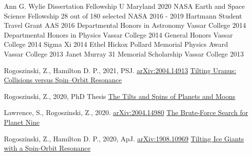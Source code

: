 \documentclass[]{awesome-cv}
\begin{document}
\vspace{-4mm}


\begin{cvhonors}
	\cvhonor
	{Ann G. Wylie Dissertation Fellowship}
	{}
	{U Maryland}
	{2020}
	\cvhonor
	{NASA Earth and Space Science Fellowship}
	{28 out of 180 selected}
	{NASA}
	{2016 - 2019}
	\cvhonor
	{Hartmann Student Travel Grant}
	{}
	{AAS}
	{2016}
	\cvhonor
	{Departmental Honors in Astronomy}
	{}
	{Vassar College}
	{2014}
	\cvhonor
	{Departmental Honors in Physics}
	{}
	{Vassar College}
	{2014}
	\cvhonor
	{General Honors}
	{}
	{Vassar College}
	{2014}
	\cvhonor
	{Sigma Xi}
	{}
	{}
	{2014}
	\cvhonor
	{Ethel Hickox Pollard Memorial Physics Award}
	{}
	{Vassar College}
	{2013}
	\cvhonor
	{Janet Murray \textquotesingle{}31 Memorial Scholarship}
	{}
	{Vassar College}
	{2013}
\end{cvhonors}
\begin{cventries}
	\cventry
	{Rogoszinski, Z., Hamilton D. P., 2021, PSJ. \href{https://arxiv.org/pdf/2004.14913.pdf}{arXiv:2004.14913}}
	{\href{https://ui.adsabs.harvard.edu/abs/2020arXiv200414913R/abstract}{Tilting Uranus: Collisions versus Spin--Orbit Resonance}}
	{}
	{}
	{}
	
	\vspace{-5mm}
	
	\cventry
	{Rogoszinski, Z., 2020, PhD Thesis}
	{\href{https://drum.lib.umd.edu/handle/1903/26852}{The Tilts and Spins of Planets and Moons}}
	{}
	{}
	{}
	
	\vspace{-5mm}
	
	\cventry
	{Lawrence, S., Rogoszinski, Z., 2020. \href{https://arxiv.org/pdf/2004.14980.pdf}{arXiv:2004.14980}}
	{\href{https://ui.adsabs.harvard.edu/abs/2020arXiv200414980L/abstract}{The Brute-Force Search for Planet Nine}}
	{}
	{}
	{}
	
	\vspace{-5mm}
	
	\cventry
	{Rogoszinski, Z., Hamilton D. P., 2020, ApJ. \href{https://arxiv.org/pdf/1908.10969.pdf}{arXiv:1908.10969}}
	{\href{https://ui.adsabs.harvard.edu/abs/2020ApJ...888...60R/abstract}{Tilting Ice Giants with a Spin-Orbit Resonance}}
	{}
	{}
	{}
	
	\vspace{-6mm}
\end{cventries}

	
\end{document}
